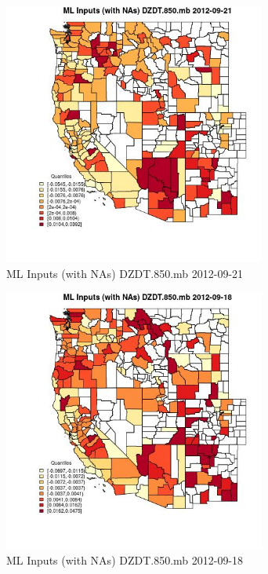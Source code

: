 \begin{figure} 
\centering  
\includegraphics[width=0.77\textwidth]{Code_Outputs/Report_ML_input_PM25_Step4_part_e_de_duplicated_aves_compiled_2019-05-14wNAs_CountyDZDT850mbMean2012-09-21_2012-09-21.jpg} 
\caption{\label{fig:Report_ML_input_PM25_Step4_part_e_de_duplicated_aves_compiled_2019-05-14wNAsCountyDZDT850mbMean2012-09-21_2012-09-21}ML Inputs (with NAs) DZDT.850.mb 2012-09-21} 
\end{figure} 
 

\begin{figure} 
\centering  
\includegraphics[width=0.77\textwidth]{Code_Outputs/Report_ML_input_PM25_Step4_part_e_de_duplicated_aves_compiled_2019-05-14wNAs_CountyDZDT850mbMean2012-09-18_2012-09-18.jpg} 
\caption{\label{fig:Report_ML_input_PM25_Step4_part_e_de_duplicated_aves_compiled_2019-05-14wNAsCountyDZDT850mbMean2012-09-18_2012-09-18}ML Inputs (with NAs) DZDT.850.mb 2012-09-18} 
\end{figure} 
 

